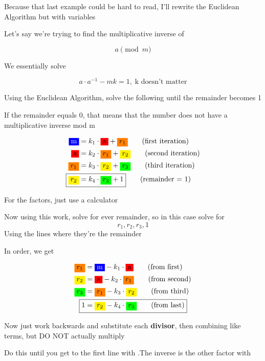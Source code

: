 \documentclass[../../Main.tex]{subfiles}
\begin{document}
\begin{definition}
Because that last example could be hard to read, I'll rewrite the Euclidean Algorithm but with variables

Let's say we're trying to find the multiplicative inverse of 

$$a \pmod{m}$$

We essentially solve

$$a \cdot a^{-1} - mk = 1, \; \text{k doesn't matter}$$

Using the Euclidean Algorithm, solve the following until the remainder becomes 1

If the remainder equals 0, that means that the number does not have a multiplicative inverse mod m

\begin{align*}
    \bluebox{m} &= k_1 \cdot \redbox{a} + \orangebox{$r_1$} \tag{first iteration} \\
    \redbox{a} &= k_2 \cdot \orangebox{$r_1$} + \yellowbox{$r_2$} \tag{second iteration} \\
    \orangebox{$r_1$} &= k_3 \cdot \yellowbox{$r_2$} + \greenbox{$r_3$} \tag{third iteration} \\
    \Aboxed{\yellowbox{$r_2$} &= k_4 \cdot \greenbox{$r_3$} + 1} \tag{remainder = 1} 
\end{align*}

For the factors, just use a calculator

Now using this work, solve for ever remainder, so in this case solve for 
$$r_1, r_2, r_3, 1$$
Using the lines where they're the remainder

In order, we get

\begin{align*}
    \orangebox{$r_1$} &= \bluebox{m} - k_1 \cdot \redbox{a} \tag{from first} \\
    \yellowbox{$r_2$} &= \redbox{a} - k_2 \cdot \orangebox{$r_1$} \tag{from second} \\
    \greenbox{$r_3$} &= \orangebox{$r_1$} - k_3 \cdot \yellowbox{$r_2$} \tag{from third} \\
    \Aboxed{1 &= \yellowbox{$r_2$} - k_4 \cdot \greenbox{$r_3$} \tag{from last}} \\
\end{align*}

Now just work backwards and substitute each \textbf{divisor}, then combining like terms, but DO NOT actually multiply

Do this until you get to the first line with .The inverse is the other factor with 
\end{definition}
\end{document}
